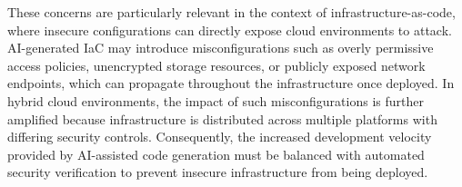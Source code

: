 These concerns are particularly relevant in the context of infrastructure-as-code, where insecure configurations can directly expose cloud environments to attack. AI-generated IaC may introduce misconfigurations such as overly permissive access policies, unencrypted storage resources, or publicly exposed network endpoints, which can propagate throughout the infrastructure once deployed. In hybrid cloud environments, the impact of such misconfigurations is further amplified because infrastructure is distributed across multiple platforms with differing security controls. Consequently, the increased development velocity provided by AI-assisted code generation must be balanced with automated security verification to prevent insecure infrastructure from being deployed.